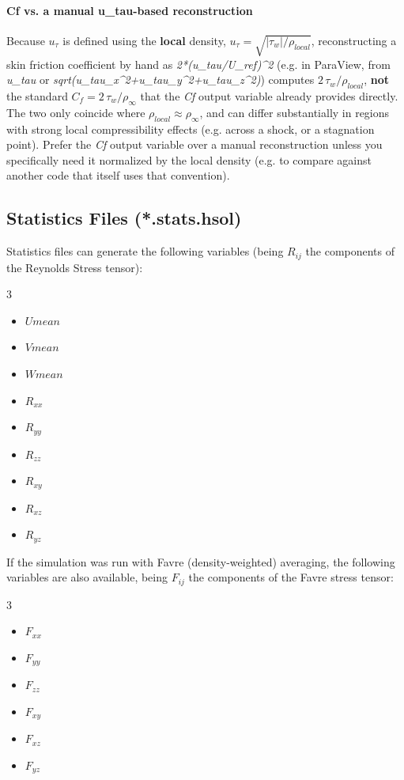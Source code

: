 \documentclass[a4paper,10pt]{report}
\begin{document}
\paragraph{Cf vs. a manual u\_tau-based reconstruction}

Because $u_\tau$ is defined using the \textbf{local} density, $u_\tau=\sqrt{|\tau_w|/\rho_{local}}$, reconstructing a skin friction coefficient by hand as \textit{2*(u\_tau/U\_ref)\textasciicircum2} (e.g. in ParaView, from \textit{u\_tau} or \textit{sqrt(u\_tau\_x\textasciicircum2+u\_tau\_y\textasciicircum2+u\_tau\_z\textasciicircum2)}) computes $2\,\tau_w/\rho_{local}$, \textbf{not} the standard $C_f = 2\,\tau_w/\rho_\infty$ that the \textit{Cf} output variable already provides directly. The two only coincide where $\rho_{local}\approx\rho_\infty$, and can differ substantially in regions with strong local compressibility effects (e.g. across a shock, or a stagnation point). Prefer the \textit{Cf} output variable over a manual reconstruction unless you specifically need it normalized by the local density (e.g. to compare against another code that itself uses that convention).

\subsection{Statistics Files (*.stats.hsol)}
Statistics files can generate the following variables (being $R_{ij}$ the components of the Reynolds Stress tensor):

\begin{multicols}{3}
\begin{itemize}
\item $Umean$
\item $Vmean$
\item $Wmean$
\item $R_{xx}$
\item $R_{yy}$
\item $R_{zz}$
\item $R_{xy}$
\item $R_{xz}$
\item $R_{yz}$
\end{itemize}
\end{multicols}

If the simulation was run with Favre (density-weighted) averaging, the following variables are also available, being $F_{ij}$ the components of the Favre stress tensor:

\begin{multicols}{3}
\begin{itemize}
\item $F_{xx}$
\item $F_{yy}$
\item $F_{zz}$
\item $F_{xy}$
\item $F_{xz}$
\item $F_{yz}$
\end{itemize}
\end{multicols}
\end{document}
